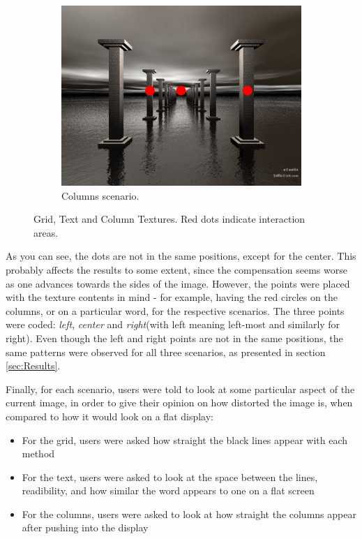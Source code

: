 \documentclass[]{article}
\begin{document}
\begin{figure}[!hbtp]
\begin{subfigure}{.33\textwidth}
  \includegraphics[width=0.9\linewidth]{figures/3D_Scene_011_allPoints.jpg}
  \caption{Columns scenario.}
  \label{fig:ColumnsTexture}
\end{subfigure}
\caption{Grid, Text and Column Textures. Red dots indicate interaction areas.}
\label{fig:GridTextColumns}
\end{figure}

As you can see, the dots are not in the same positions, except for the center. This probably affects the results to some extent, since the compensation seems worse as one advances towards the sides of the image. However, the points were placed with the texture contents in mind - for example, having the red circles on the columns, or on a particular word, for the respective scenarios. The three points were coded: \textit{left}, \textit{center} and \textit{right}(with left meaning left-most and similarly for right). Even though the left and right points are not in the same positions, the same patterns were observed for all three scenarios, as presented in section \ref{sec:Results}.

Finally, for each scenario, users were told to look at some particular aspect of the current image, in order to give their opinion on how distorted the image is, when compared to how it would look on a flat display:
\begin{itemize}
\item For the grid, users were asked how straight the black lines appear with each method
\item For the text, users were asked to look at the space between the lines, readibility, and how similar the word appears to one on a flat screen
\item For the columns, users were asked to look at how straight the columns appear after pushing into the display
\end{itemize}
\end{document}
